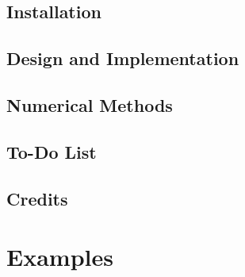 \documentclass[letterpaper]{book}
\begin{document}

  


\chapter{Installation}
\label{chap:Installation}





\chapter{Design and Implementation}
\label{chap:Design}





\chapter{Numerical Methods}
\label{chap:Numerics}





\chapter{To-Do List}
\label{chap:ToDo}





\chapter{Credits}
\label{chap:Credits}






\part{Examples}
\label{part:Examples}
\end{document}
